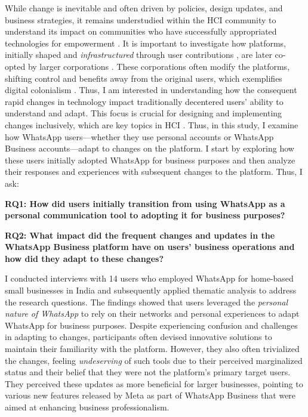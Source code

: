 While change is inevitable and often driven by policies, design updates, and business strategies, it remains understudied within the HCI community to understand its impact on communities who have successfully appropriated technologies for empowerment \cite{10.1145/3443686, 10.1145/3613905.3651034}. It is important to investigate how platforms, initially shaped and \textit{infrastructured} through user contributions \cite{10.1145/3313831.3376201}, are later co-opted by larger corporations \cite{doi:10.1177/1461444816629474}. These corporations often modify the platforms, shifting control and benefits away from the original users, which exemplifies digital colonialism \cite{Thorat2020}. Thus, I am interested in understanding how the consequent rapid changes in technology impact traditionally decentered users' ability to understand and adapt. This focus is crucial for designing and implementing changes inclusively, which are key topics in HCI \cite{10.1145/3544548.3581040}. Thus, in this study, I examine how WhatsApp users—whether they use personal accounts or WhatsApp Business accounts—adapt to changes on the platform. I start by exploring how these users initially adopted WhatsApp for business purposes and then analyze their responses and experiences with subsequent changes to the platform. Thus, I ask:

\textbf{RQ1: How did users initially transition from using WhatsApp as a personal communication tool to adopting it for business purposes?}
    
\textbf{RQ2: What impact did the frequent changes and updates in the WhatsApp Business platform have on users' business operations and how did they adapt to these changes?}

I conducted interviews with 14 users who employed WhatsApp for home-based small businesses in India and subsequently applied thematic analysis to address the research questions. The findings showed that users leveraged the \textit{personal nature of WhatsApp} to rely on their networks and personal experiences to adapt WhatsApp for business purposes. Despite experiencing confusion and challenges in adapting to changes, participants often devised innovative solutions to maintain their familiarity with the platform. However, they also often trivialized the changes, feeling \textit{undeserving} of such tools due to their perceived marginalized status and their belief that they were not the platform’s primary target users. They perceived these updates as more beneficial for larger businesses, pointing to various new features released by Meta as part of WhatsApp Business that were aimed at enhancing business professionalism. 


